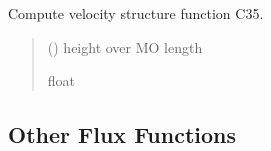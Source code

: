 \documentclass[letterpaper,10pt,english]{sphinxmanual}
\begin{document}
\begin{fulllineitems}

\pysigstartsignatures
{}
\pysigstopsignatures
\sphinxAtStartPar
Compute velocity structure function C35.
\begin{quote}\begin{description}
\sphinxAtStartPar
{} () \textendash{} height over MO length

\sphinxAtStartPar
{}

\sphinxAtStartPar
float

\end{description}\end{quote}

\end{fulllineitems}



\subsection{Other Flux Functions}
\label{\detokenize{users_guide:other-flux-functions}}
\end{document}
